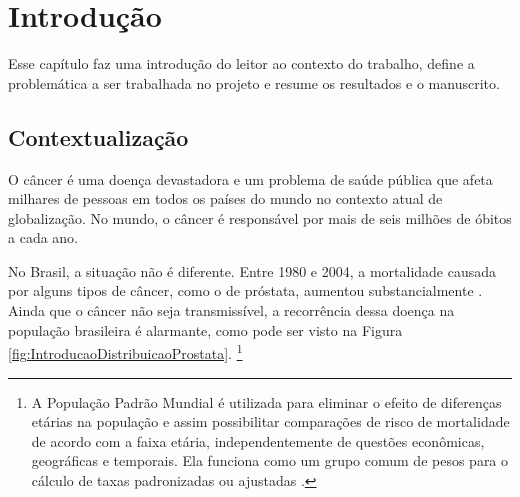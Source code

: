  


\chapter{Introdução}

\label{CapIntro}


Esse capítulo faz uma introdução do leitor ao contexto do trabalho,
define a problemática a ser trabalhada no projeto e resume os resultados
e o manuscrito.


\section{Contextualização}

O câncer é uma doença devastadora e um problema de saúde pública que
afeta milhares de pessoas em todos os países do mundo no contexto
atual de globalização. No mundo, o câncer é responsável por mais de
seis milhões de óbitos a cada ano. 

No Brasil, a situação não é diferente. Entre 1980 e 2004, a mortalidade
causada por alguns tipos de câncer, como o de próstata, aumentou substancialmente
\cite{LuizAugustoMarcondesFonseca2010,MaximilianoRibeiroGuerra2005}.
Ainda que o câncer não seja transmissível, a recorrência dessa doença
na população brasileira é alarmante, como pode ser visto na Figura
\ref{fig:IntroducaoDistribuicaoProstata}.%
\footnote{A População Padrão Mundial é utilizada para eliminar o efeito de diferenças
etárias na população e assim possibilitar comparações de risco de
mortalidade de acordo com a faixa etária, independentemente de questões
econômicas, geográficas e temporais. Ela funciona como um grupo comum
de pesos para o cálculo de taxas padronizadas ou ajustadas \cite{1999-2003}.%
} 

